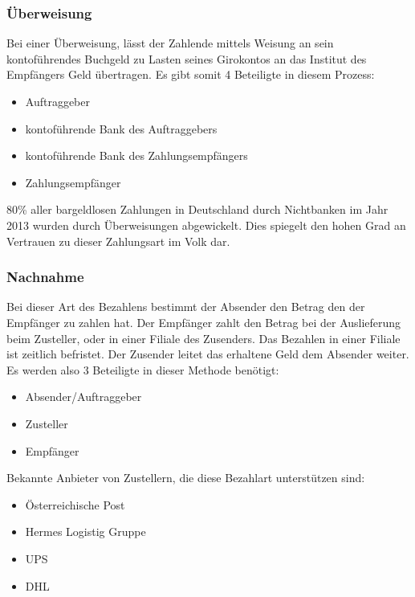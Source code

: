 \subsubsection{Überweisung}
Bei einer Überweisung, lässt der Zahlende mittels Weisung an sein kontoführendes Buchgeld zu Lasten seines Girokontos an das Institut des Empfängers Geld übertragen. Es gibt somit 4 Beteiligte in diesem Prozess:
\begin{itemize}
	\item Auftraggeber
	\item kontoführende Bank des Auftraggebers
	\item kontoführende Bank des Zahlungsempfängers
	\item Zahlungsempfänger
\end{itemize}
80\% aller bargeldlosen Zahlungen in Deutschland durch Nichtbanken im Jahr 2013 wurden durch Überweisungen abgewickelt. Dies spiegelt den hohen Grad an Vertrauen zu dieser Zahlungsart im Volk dar.

\subsubsection{Nachnahme}
Bei dieser Art des Bezahlens bestimmt der Absender den Betrag den der Empfänger zu zahlen hat. Der Empfänger zahlt den Betrag bei der Auslieferung beim Zusteller, oder in einer Filiale des Zusenders. Das Bezahlen in einer Filiale ist zeitlich befristet. Der Zusender leitet das erhaltene Geld dem Absender weiter.
Es werden also 3 Beteiligte in dieser Methode benötigt:
\begin{itemize}
	\item Absender/Auftraggeber
	\item Zusteller
	\item Empfänger
\end{itemize}
Bekannte Anbieter von Zustellern, die diese Bezahlart unterstützen sind:
\begin{itemize}
	\item Österreichische Post
	\item Hermes Logistig Gruppe
	\item UPS
	\item DHL
\end{itemize}